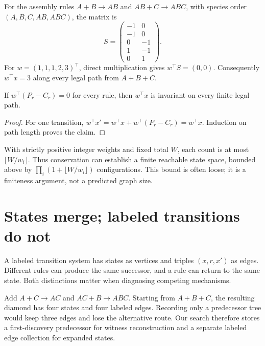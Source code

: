 For the assembly rules $A+B\to AB$ and $AB+C\to ABC$, with species order
$(A,B,C,AB,ABC)$, the matrix is
\[
S=\begin{pmatrix}
-1&0\\-1&0\\0&-1\\1&-1\\0&1
\end{pmatrix}.
\]
For $w=(1,1,1,2,3)^\top$, direct multiplication gives $w^\top S=(0,0)$.
Consequently $w^\top x=3$ along every legal path from $A+B+C$.


\begin{proposition}
If $w^\top(P_r-C_r)=0$ for every rule, then $w^\top x$ is invariant on every
finite legal path.
\end{proposition}
\begin{proof}
For one transition, $w^\top x'=w^\top x+w^\top(P_r-C_r)=w^\top x$.
Induction on path length proves the claim.
\end{proof}
With strictly positive integer weights and fixed total $W$, each count is at most
$\lfloor W/w_i\rfloor$. Thus conservation can establish a finite reachable state
space, bounded above by $\prod_i(1+\lfloor W/w_i\rfloor)$ configurations. This
bound is often loose; it is a finiteness argument, not a predicted graph size.

\section{States merge; labeled transitions do not}
A labeled transition system has states as vertices and triples $(x,r,x')$ as
edges. Different rules can produce the same successor, and a rule can return to
the same state. Both distinctions matter when diagnosing competing mechanisms.


Add $A+C\to AC$ and $AC+B\to ABC$. Starting from $A+B+C$, the resulting diamond
has four states and four labeled edges. Recording only a predecessor tree would
keep three edges and lose the alternative route. Our search therefore stores a
first-discovery predecessor for witness reconstruction and a separate labeled
edge collection for expanded states.

